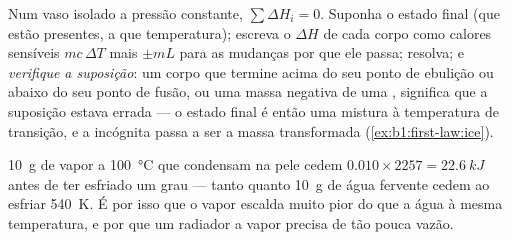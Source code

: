 \begin{method}\label{meth:b1:phase-changes:calorimetry}
Num vaso isolado a pressão constante, $\sum\Delta H_i = 0$. Suponha
o estado final (que  estão presentes, a que temperatura);
escreva o $\Delta H$ de cada corpo como calores sensíveis $mc\,\Delta T$ mais
 $\pm mL$ para as mudanças por que ele passa; resolva; e
\emph{verifique a suposição}: um corpo que termine acima do seu ponto de
ebulição ou abaixo do seu ponto de fusão, ou uma massa negativa de uma
, significa que a suposição estava errada --- o estado final é então uma
mistura à temperatura de transição, e a incógnita passa a ser a massa
transformada (\cref{ex:b1:first-law:ice}).
\end{method}

\begin{example}\label{ex:b1:phase-changes:steam}
\qty{10}{g} de vapor a \qty{100}{\degreeCelsius} que condensam na pele cedem
$0.010 \times 2257 = \qty{22.6}{kJ}$ antes de ter esfriado um grau ---
tanto quanto \qty{10}{g} de água fervente cedem ao esfriar
\qty{540}{K}. É por isso que o vapor escalda muito pior do que a água à
mesma temperatura, e por que um radiador a vapor precisa de tão pouca vazão.
\end{example}

